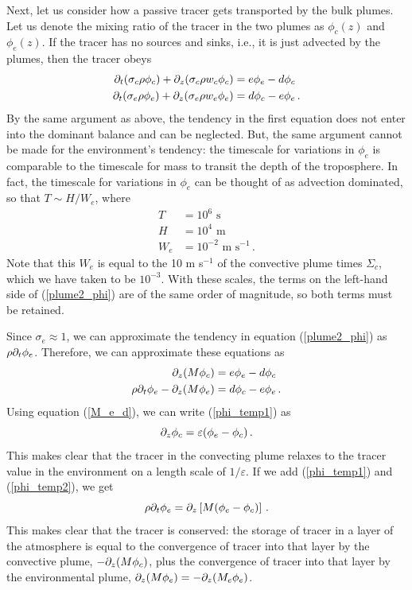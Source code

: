 \documentclass[12pt]{article}
\begin{document}
Next, let us consider how a passive tracer gets transported by the bulk plumes.  Let us denote the mixing ratio of the tracer in the two plumes as $\phi_c(z)$ and $\phi_e(z)$.  If the tracer has no sources and sinks, i.e., it is just advected by the plumes, then the tracer obeys
\begin{align}
\partial_t (\sigma_c \rho \phi_c) + \partial_z (\sigma_c \rho w_c \phi_c) &= e \phi_e - d \phi_c \label{plume1_phi} \\
\partial_t (\sigma_e \rho \phi_e) + \partial_z (\sigma_e \rho w_e \phi_e) &= d \phi_c - e \phi_e \, . \label{plume2_phi}
\end{align}
By the same argument as above, the tendency in the first equation does not enter into the dominant balance and can be neglected.  But, the same argument cannot be made for the environment's tendency: the timescale for variations in $\phi_e$ is comparable to the timescale for mass to transit the depth of the troposphere.  In fact, the timescale for variations in $\phi_e$ can be thought of as advection dominated, so that $T \sim H/W_e$, where
\begin{align}
T &= 10^6 \text{ s} \\
H &= 10^4 \text{ m} \\
W_e &= 10^{-2} \text{ m s}^{-1} \, .
\end{align}
Note that this $W_e$ is equal to the 10 m s$^{-1}$ of the convective plume times $\Sigma_c$, which we have taken to be $10^{-3}$.  With these scales, the terms on the left-hand side of (\ref{plume2_phi}) are of the same order of magnitude, so both terms must be retained.


Since $\sigma_e \approx 1$, we can approximate the tendency in equation (\ref{plume2_phi}) as $\rho \partial_t \phi_e$.  Therefore, we can approximate these equations as
\begin{align}
\partial_z (M \phi_c) &= e \phi_e - d \phi_c \label{phi_temp1} \\
\rho \partial_t \phi_e - \partial_z (M \phi_e) &= d \phi_c - e \phi_e \label{phi_temp2} \, .
\end{align}
Using equation (\ref{M_e_d}), we can write (\ref{phi_temp1}) as
\begin{equation}
\partial_z \phi_c = \varepsilon (\phi_e - \phi_c) \label{ppz_phic} \, .
\end{equation}
This makes clear that the tracer in the convecting plume relaxes to the tracer value in the environment on a length scale of $1/\varepsilon$.  If we add (\ref{phi_temp1}) and (\ref{phi_temp2}), we get
\begin{equation}
\rho \partial_t \phi_e = \partial_z \left[ M(\phi_e - \phi_c) \right] \, . \label{ppt_phie_flux}
\end{equation}
This makes clear that the tracer is conserved: the storage of tracer in a layer of the atmosphere is equal to the convergence of tracer into that layer by the convective plume, $-\partial_z (M\phi_c)$, plus the convergence of tracer into that layer by the environmental plume, $\partial_z (M\phi_e) = -\partial_z(M_e \phi_e)$.
\end{document}
